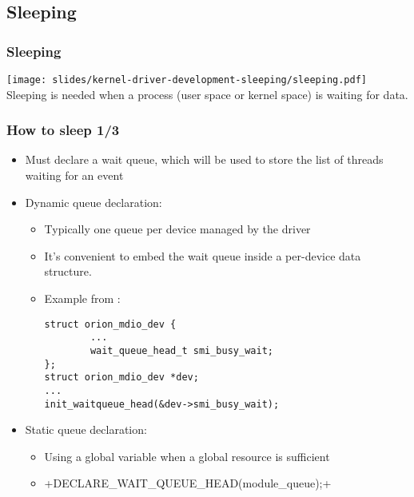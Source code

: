 \subsection{Sleeping}

\begin{frame}
  \frametitle{Sleeping}
  \begin{center}
    \texttt{[image: slides/kernel-driver-development-sleeping/sleeping.pdf]}\\
    Sleeping is needed when a process (user space or kernel space) is
    waiting for data.
  \end{center}
\end{frame}

\begin{frame}[fragile]
  \frametitle{How to sleep 1/3}
  \begin{itemize}
  \item Must declare a wait queue, which will be used to store the list of threads
        waiting for an event
  \item Dynamic queue declaration:
      \begin{itemize}
      \item Typically one queue per device managed by the driver
      \item It's convenient to embed the wait queue inside a per-device data
        structure.
      \item Example from :
\begin{verbatim}
struct orion_mdio_dev {
        ...
        wait_queue_head_t smi_busy_wait;
};
struct orion_mdio_dev *dev;
...
init_waitqueue_head(&dev->smi_busy_wait);
\end{verbatim}
    \end{itemize}
    \item Static queue declaration:
      \begin{itemize}
      \item Using a global variable when a global resource is sufficient
      \item {}+DECLARE_WAIT_QUEUE_HEAD(module_queue);+
      \end{itemize}
  \end{itemize}
\end{frame}

